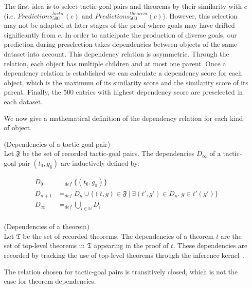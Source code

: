 \documentclass[runningheads,a4paper,draft]{svjour3}
\begin{document}
The first idea is to select tactic-goal pairs and theorems by their similarity
with $c$ (i.e. $\mathit{Predictions}^{\mathit{tactic}}_{500} (c)$ and
$\mathit{Predictions}^{\mathit{theorem}}_{500} (c)$).
However, this selection may not be adapted at later stages of
the proof where goals may have drifted significantly from $c$. In order to
anticipate the production of diverse goals, our prediction during preselection
takes dependencies between objects of the same dataset into account.
This dependency relation is asymmetric. Through the relation, each object has
multiple children and at most one parent.
Once a dependency relation is established we can calculate a dependency score
for each object, which is the maximum of its similarity score
and the similarity score of its parent. Finally, the 500 entries with
highest dependency score are preselected in each dataset.

We now give a mathematical definition of the dependency relation for each kind
of object.

\begin{definition}(Dependencies of a tactic-goal pair)\\
Let $\mathfrak{F}$ be the set of recorded tactic-goal pairs.
The dependencies $D_\infty$ of a tactic-goal pair $(t_0,g_0)$ are
inductively defined by:

\begin{align*}
D_0 &=_{def} \lbrace (t_0,g_0) \rbrace \\
D_{n+1} &=_{def} D_n \cup \lbrace (t,g)\in \mathfrak{F}\  |\ \exists
(t',g') \in D_n.\ g \in t'(g') \rbrace  \\
D_\infty &=_{def} \bigcup_{i \in \mathbb{N}} D_i\\
\end{align*}
\end{definition}


\begin{definition}(Dependencies of a theorem)\\
Let $\mathfrak{T}$ be the set of recorded theorems.
The dependencies of a theorem $t$ are the set of top-level theorems in
$\mathfrak{T}$ appearing in the proof of $t$. These dependencies are
recorded by tracking the use of top-level theorems through the inference
kernel~\cite{tgck-cpp15}.
\end{definition}

\begin{remark}
The relation chosen for tactic-goal pairs is transitively closed, which is not
the case for theorem dependencies.
\end{remark}
\end{document}
